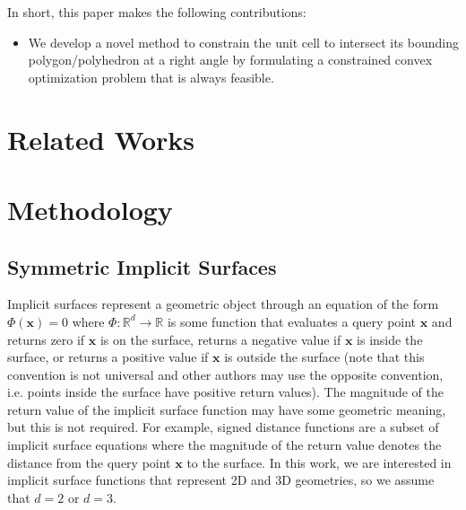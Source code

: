 \documentclass[acmtog]{acmart}
\begin{document}
In short, this paper makes the following contributions:
\begin{itemize}
  \item We develop a novel method to constrain the unit cell to intersect its bounding polygon/polyhedron at a right angle by formulating a constrained convex optimization problem that is always feasible.
\end{itemize}

\section{Related Works}

\section{Methodology}

\subsection{Symmetric Implicit Surfaces}
\label{sec:symmetric_implicit_surfaces}

Implicit surfaces represent a geometric object through an equation of the form $\Phi(\mathbf{x}) = 0$ where $\Phi: \mathbb{R}^d \rightarrow \mathbb{R}$ is some function that evaluates a query point $\mathbf{x}$ and returns zero if $\mathbf{x}$ is on the surface, returns a negative value if $\mathbf{x}$ is inside the surface, or returns a positive value if $\mathbf{x}$ is outside the surface (note that this convention is not universal and other authors may use the opposite convention, i.e. points inside the surface have positive return values). The magnitude of the return value of the implicit surface function may have some geometric meaning, but this is not required. For example, signed distance functions are a subset of implicit surface equations where the magnitude of the return value denotes the distance from the query point $\mathbf{x}$ to the surface. In this work, we are interested in implicit surface functions that represent 2D and 3D geometries, so we assume that $d = 2$ or $d = 3$.
\end{document}
